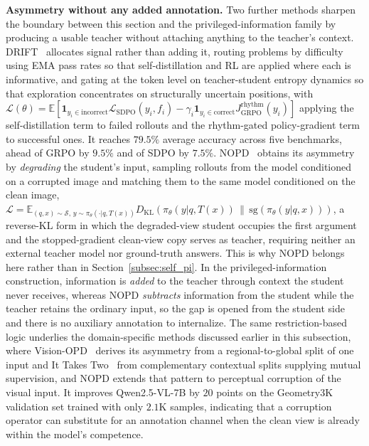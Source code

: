 \documentclass{article} %
\newcommand{\E}{\mathbb{E}}
\newcommand{\KL}{D_{\mathrm{KL}}}
\newcommand{\loss}{\mathcal{L}}
\begin{document}
\textbf{Asymmetry without any added annotation.} Two further methods sharpen the boundary between this section and the privileged-information family by producing a usable teacher without attaching anything to the teacher's context. DRIFT~\citep{2606.30345} allocates signal rather than adding it, routing problems by difficulty using EMA pass rates so that self-distillation and RL are applied where each is informative, and gating at the token level on teacher-student entropy dynamics so that exploration concentrates on structurally uncertain positions, with $\loss(\theta) = \E[\mathbf{1}_{y_i \in \text{incorrect}} \loss_{\text{SDPO}}(y_i, f_i) - \gamma_i \mathbf{1}_{y_i \in \text{correct}} J^{\text{rhythm}}_{\text{GRPO}}(y_i)]$ applying the self-distillation term to failed rollouts and the rhythm-gated policy-gradient term to successful ones. It reaches $79.5\%$ average accuracy across five benchmarks, ahead of GRPO by $9.5\%$ and of SDPO by $7.5\%$. NOPD~\citep{2607.23125} obtains its asymmetry by \emph{degrading} the student's input, sampling rollouts from the model conditioned on a corrupted image and matching them to the same model conditioned on the clean image, $\loss = \E_{(q,x) \sim \mathcal{S},\, y \sim \pi_\theta(\cdot|q, T(x))} \KL(\pi_\theta(y|q, T(x)) \,\|\, \mathrm{sg}(\pi_\theta(y|q,x)))$, a reverse-KL form in which the degraded-view student occupies the first argument and the stopped-gradient clean-view copy serves as teacher, requiring neither an external teacher model nor ground-truth answers. This is why NOPD belongs here rather than in Section~\ref{subsec:self_pi}. In the privileged-information construction, information is \emph{added} to the teacher through context the student never receives, whereas NOPD \emph{subtracts} information from the student while the teacher retains the ordinary input, so the gap is opened from the student side and there is no auxiliary annotation to internalize. The same restriction-based logic underlies the domain-specific methods discussed earlier in this subsection, where Vision-OPD~\citep{2605.18740} derives its asymmetry from a regional-to-global split of one input and It Takes Two~\citep{2605.20258} from complementary contextual splits supplying mutual supervision, and NOPD extends that pattern to perceptual corruption of the visual input. It improves Qwen2.5-VL-7B by $20$ points on the Geometry3K validation set trained with only $2.1$K samples, indicating that a corruption operator can substitute for an annotation channel when the clean view is already within the model's competence.
\end{document}
